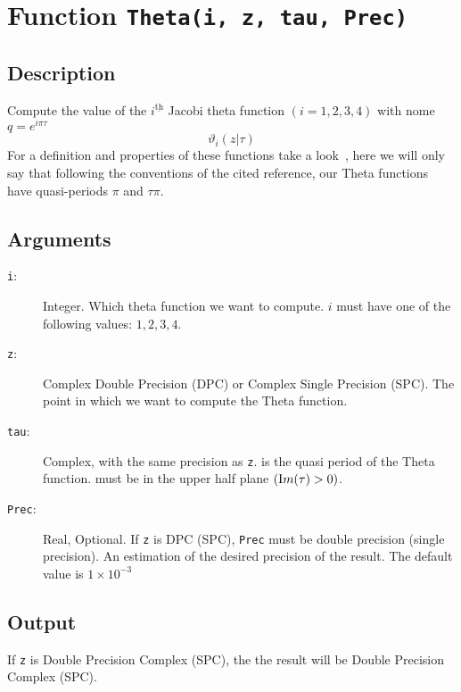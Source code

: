 \section{Function \texttt{Theta(i, z, tau, Prec)}}

\subsection{Description}

Compute the value of the $i^{\underline{\text{th}}}$ Jacobi theta
function $(i=1,2,3,4)$ with nome $q=e^{i\pi\tau}$ 
\begin{equation}
  \vartheta_i(z|\tau)
\end{equation}
For a definition and properties of these functions take a
look~\cite{ww:analysis}, here we will only say that following the
conventions of the cited reference, our Theta functions have
quasi-periods $\pi$ and $\tau\pi$. 

\subsection{Arguments}

\begin{description}
\item[\texttt{i}:] Integer. Which theta function we
  want to compute. $i$ must have one of the following values: $1,2,3,4$.
\item[\texttt{z}:] Complex Double Precision (DPC) or Complex Single
  Precision (SPC). The point in which we want to compute the Theta
  function.
\item[\texttt{tau}:] Complex, with the same precision as
  \texttt{z}. is the quasi period of the Theta function. must be in
  the upper half plane $(\textrm Im(\tau)> 0)$.
\item[\texttt{Prec}:] Real, Optional. If \texttt{z} is DPC (SPC),
  \texttt{Prec} must be double precision (single precision). An
  estimation of the desired precision of the result. The default value
  is $1\times 10^{-3}$
\end{description}

\subsection{Output}

If \texttt{z} is Double Precision Complex (SPC), the the result will be
Double Precision Complex (SPC).


